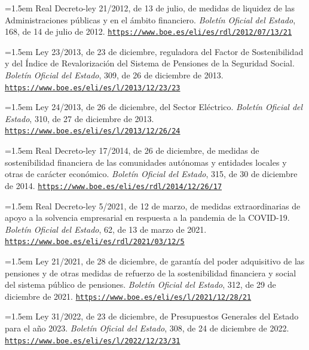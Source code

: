 \documentclass[10pt,a4paper]{article}
\begin{document}
\noindent\hangindent=1.5em Real Decreto-ley 21/2012, de 13 de julio, de medidas de liquidez de las Administraciones públicas y en el ámbito financiero. \textit{Boletín Oficial del Estado}, 168, de 14 de julio de 2012. \href{https://www.boe.es/eli/es/rdl/2012/07/13/21}{\nolinkurl{https://www.boe.es/eli/es/rdl/2012/07/13/21}}

\noindent\hangindent=1.5em Ley 23/2013, de 23 de diciembre, reguladora del Factor de Sostenibilidad y del Índice de Revalorización del Sistema de Pensiones de la Seguridad Social. \textit{Boletín Oficial del Estado}, 309, de 26 de diciembre de 2013. \href{https://www.boe.es/eli/es/l/2013/12/23/23}{\nolinkurl{https://www.boe.es/eli/es/l/2013/12/23/23}}

\noindent\hangindent=1.5em Ley 24/2013, de 26 de diciembre, del Sector Eléctrico. \textit{Boletín Oficial del Estado}, 310, de 27 de diciembre de 2013. \href{https://www.boe.es/eli/es/l/2013/12/26/24}{\nolinkurl{https://www.boe.es/eli/es/l/2013/12/26/24}}

\noindent\hangindent=1.5em Real Decreto-ley 17/2014, de 26 de diciembre, de medidas de sostenibilidad financiera de las comunidades autónomas y entidades locales y otras de carácter económico. \textit{Boletín Oficial del Estado}, 315, de 30 de diciembre de 2014. \href{https://www.boe.es/eli/es/rdl/2014/12/26/17}{\nolinkurl{https://www.boe.es/eli/es/rdl/2014/12/26/17}}

\noindent\hangindent=1.5em Real Decreto-ley 5/2021, de 12 de marzo, de medidas extraordinarias de apoyo a la solvencia empresarial en respuesta a la pandemia de la COVID-19. \textit{Boletín Oficial del Estado}, 62, de 13 de marzo de 2021. \href{https://www.boe.es/eli/es/rdl/2021/03/12/5}{\nolinkurl{https://www.boe.es/eli/es/rdl/2021/03/12/5}}

\noindent\hangindent=1.5em Ley 21/2021, de 28 de diciembre, de garantía del poder adquisitivo de las pensiones y de otras medidas de refuerzo de la sostenibilidad financiera y social del sistema público de pensiones. \textit{Boletín Oficial del Estado}, 312, de 29 de diciembre de 2021. \href{https://www.boe.es/eli/es/l/2021/12/28/21}{\nolinkurl{https://www.boe.es/eli/es/l/2021/12/28/21}}

\noindent\hangindent=1.5em Ley 31/2022, de 23 de diciembre, de Presupuestos Generales del Estado para el año 2023. \textit{Boletín Oficial del Estado}, 308, de 24 de diciembre de 2022. \href{https://www.boe.es/eli/es/l/2022/12/23/31}{\nolinkurl{https://www.boe.es/eli/es/l/2022/12/23/31}}
\end{document}
